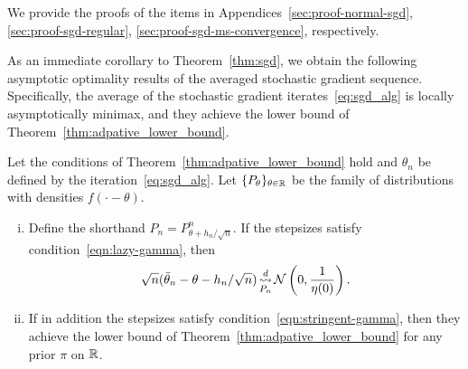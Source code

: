 \noindent
We provide the proofs of the items in Appendices~\ref{sec:proof-normal-sgd},
\ref{sec:proof-sgd-regular}, \ref{sec:proof-sgd-ms-convergence},
respectively.

As an immediate corollary to Theorem~\ref{thm:sgd}, we obtain the following
asymptotic optimality results of the averaged stochastic gradient
sequence. Specifically, the average of the stochastic gradient
iterates~\eqref{eq:sgd_alg}
is locally asymptotically minimax, and they achieve the lower
bound of Theorem~\ref{thm:adpative_lower_bound}.

\begin{corollary}
  Let the conditions of Theorem~\ref{thm:adpative_lower_bound} hold
  and $\theta_n$ be defined by the iteration~\eqref{eq:sgd_alg}.
  Let $\{P_\theta\}_{\theta \in \mathbb{R}}$ be the family of distributions
  with densities $f(\cdot - \theta)$.
  \begin{enumerate}[(i)]
  \item Define the shorthand $P_n = P_{\theta + h_n/\sqrt{n}}^n$.
    If the stepsizes satisfy condition~\eqref{eqn:lazy-gamma}, then
    \begin{equation*}
      \sqrt{n}(\bar{\theta}_n - \theta - h_n / \sqrt{n})
      \mathop{\stackrel{d}{\rightsquigarrow}}_{P_n} \mathcal{N}\left(0, \frac{1}{\eta(0)}\right).
    \end{equation*}
  \item If in addition the stepsizes satisfy
    condition~\eqref{eqn:stringent-gamma}, then they
    achieve the lower bound of Theorem~\ref{thm:adpative_lower_bound} for any
    prior $\pi$ on $\mathbb{R}$.
  \end{enumerate}
\end{corollary}

